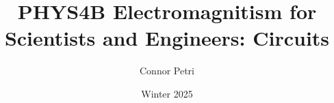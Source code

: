 \documentclass[12pt, letterpaper]{article}
\title{
    PHYS4B Electromagnitism for Scientists and Engineers: Circuits
}
\author{Connor Petri}
\date{Winter 2025}
\begin{document}
\maketitle
\tableofcontents
\pagebreak




\end{document}
